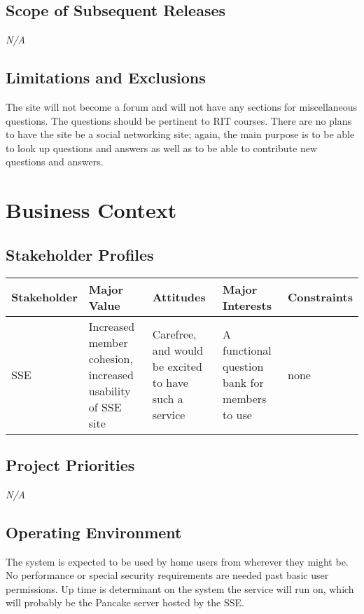 \documentclass{report}
\begin{document}
    \subsection{Scope of Subsequent Releases}
      \textit{N/A}
    \subsection{Limitations and Exclusions}
The site will not become a forum and will not have any sections for miscellaneous questions. The questions should be pertinent to RIT courses.
There are no plans to have the site be a social networking site; again, the main purpose is to be able to look up questions and answers as well as to be able to contribute new questions and answers.
  \section{Business Context}
    \subsection{Stakeholder Profiles}
      \begin{tabular}{ | p{0.8in} | p{1in} | p{1in} | p{1.2in} | p{0.8in} | }
        \hline
        \textbf{Stakeholder} & \textbf{Major Value} & \textbf{Attitudes} & \textbf{Major Interests} & \textbf{Constraints} \\ 
        \hline \hline
SSE & Increased member cohesion, increased usability of SSE site & Carefree, and would be excited to have such a service & A functional question bank for members to use & none \\ \hline
        \hline
      \end{tabular}
      \subsection{Project Priorities}
      \textit{N/A}
    \subsection{Operating Environment}
The system is expected to be used by home users from wherever they might be. No performance or special security requirements are needed past basic user permissions. Up time is determinant on the system the service will run on, which will probably be the Pancake server hosted by the SSE.
	 
\end{document}
